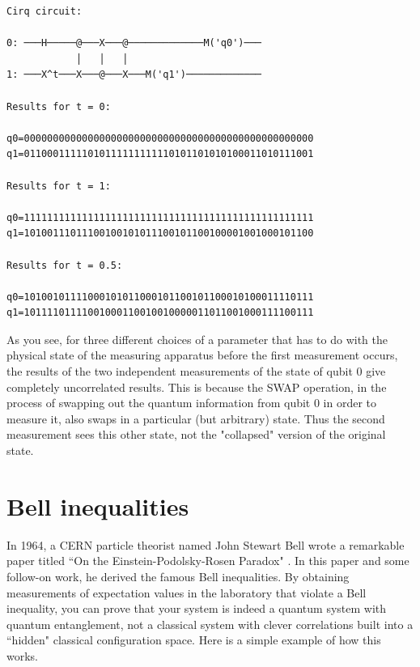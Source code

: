 \documentclass[a4paper,11pt]{article}
\begin{document}
\begin{verbatim}
Cirq circuit:

0: ───H─────@───X───@─────────────M('q0')───
            │   │   │
1: ───X^t───X───@───X───M('q1')─────────────

Results for t = 0:

q0=00000000000000000000000000000000000000000000000000
q1=01100011111010111111111110101101010100011010111001

Results for t = 1:

q0=11111111111111111111111111111111111111111111111111
q1=10100111011100100101011100101100100001001000101100

Results for t = 0.5:

q0=10100101111000101011000101100101100010100011110111
q1=10111101111001000110010010000011011001000111100111
\end{verbatim}


As you see, for three different choices of a parameter that has to do with the physical state of the measuring apparatus before the first measurement occurs,
the results of the two independent measurements of the state of qubit 0 give completely uncorrelated results. This is because the SWAP operation,
in the process of swapping out the quantum information from qubit 0 in order to measure it, also swaps in a particular (but arbitrary) state. Thus the second
measurement sees this other state, not the "collapsed" version of the original state.


\section{Bell inequalities}\label{sec:Bellinequality}
In 1964, a CERN particle theorist named John Stewart Bell wrote a remarkable paper titled ``On the Einstein-Podolsky-Rosen Paradox" \cite{Bell:1964kc}.
In this paper and
some follow-on work, he derived the famous Bell inequalities. By obtaining measurements of expectation values in the laboratory that violate a Bell
inequality, you can prove that your system is indeed a quantum system with quantum entanglement, not a classical system with clever correlations built into
a ``hidden" classical configuration space. Here is a simple example of how this works.
\end{document}
